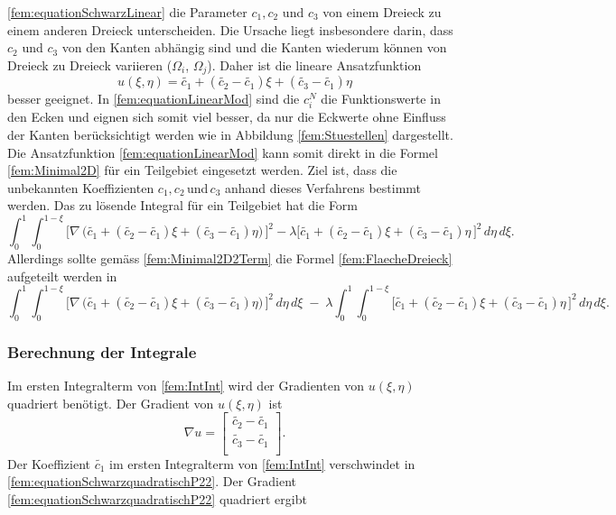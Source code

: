 \eqref{fem:equationSchwarzLinear} die Parameter $c_1, c_2$ und $c_3$
von einem Dreieck zu einem anderen Dreieck unterscheiden.
Die Ursache liegt insbesondere darin, dass $c_2$ und $c_3$ von den
Kanten abhängig sind und die Kanten wiederum können von Dreieck zu
Dreieck variieren ($\Omega_i$, $\Omega_j$).
Daher ist die lineare Ansatzfunktion 
\begin{equation}
u(\xi, \eta) = \tilde{c_1} + (\tilde{c_2} -\tilde{c_1})\xi + (\tilde{c_3} - \tilde{c_1})\eta
\label{fem:equationLinearMod}
\end{equation}
besser geeignet.
In \eqref{fem:equationLinearMod} sind die $c_i^N$ die Funktionswerte
in den Ecken und eignen sich somit viel besser, da nur die Eckwerte
ohne Einfluss der Kanten berücksichtigt werden wie in Abbildung
\ref{fem:Stuestellen} dargestellt.
Die Ansatzfunktion \eqref{fem:equationLinearMod} kann somit direkt
in die Formel \eqref{fem:Minimal2D} für ein Teilgebiet eingesetzt
werden.
Ziel ist, dass die unbekannten Koeffizienten $c_1, c_2 \, $und$
\, c_3$ anhand dieses Verfahrens bestimmt werden.
Das zu lösende Integral für ein Teilgebiet hat die Form
\begin{equation}
\int_0^1 \int_0^{1 - \xi} \bigl[ \nabla \, \bigl( \tilde{c_1} + (\tilde{c_2} - \tilde{c_1})\xi + (\tilde{c_3} - \tilde{c_1})\eta \bigr) \, \bigr]^2 - \lambda \bigl[\tilde{c_1} + (\tilde{c_2} - \tilde{c_1})\xi + (\tilde{c_3} -\tilde{c_1})\eta \, \bigr]^2 \, d \eta \, d \xi.
\label{fem:FlaecheDreieck}
\end{equation}
Allerdings sollte gemäss \eqref{fem:Minimal2D2Term} die Formel \eqref{fem:FlaecheDreieck} aufgeteilt werden in
\begin{equation}
\int_0^1 \int_0^{1 - \xi} \bigl[ \nabla \, \bigl( \tilde{c_1} + (\tilde{c_2} - \tilde{c_1})\xi + (\tilde{c_3} - \tilde{c_1})\eta \bigr) \, \bigr]^2 \, d \eta \, d \xi \; - \; \lambda \int_0^1 \int_0^{1 - \xi} \bigl[\tilde{c_1} + (\tilde{c_2} - \tilde{c_1})\xi + (\tilde{c_3} - \tilde{c_1})\eta \, \bigr]^2 \, d \eta  \, d \xi.
\label{fem:IntInt}
\end{equation}

\subsubsection{Berechnung der Integrale}

Im ersten Integralterm von \eqref{fem:IntInt} wird der Gradienten
von $u(\xi, \eta)$  quadriert benötigt.
Der Gradient von $u(\xi, \eta)$ ist 
\begin{equation}
	\nabla u = 	
	\left[ \begin{array}{r}
	\tilde{c_2} - \tilde{c_1} \\
	\tilde{c_3} - \tilde{c_1} \\
	\end{array}\right].
	\label{fem:equationSchwarzquadratischP22}
\end{equation} 
Der Koeffizient $\tilde{c_1}$ im ersten Integralterm von
\eqref{fem:IntInt} verschwindet in
\eqref{fem:equationSchwarzquadratischP22}.
Der Gradient \eqref{fem:equationSchwarzquadratischP22} quadriert
ergibt

